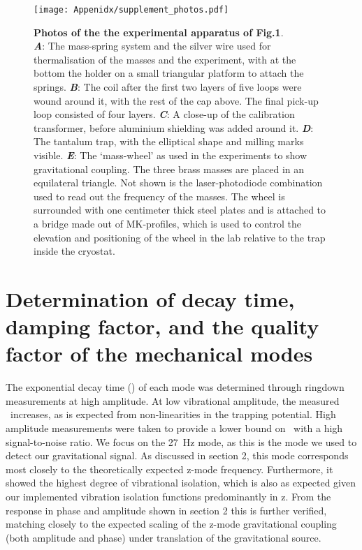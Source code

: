 \begin{appendices}
\begin{figure}[ht]
\centering
\texttt{[image: Appenidx/supplement\_photos.pdf]}%
\caption{\textbf{Photos of the the experimental apparatus of Fig.1}.\\ \textbf{\emph{A}}: The mass-spring system and the silver wire used for thermalisation of the masses and the experiment, with at the bottom the holder on a small triangular platform to attach the springs. \textbf{\emph{B}}: The coil after the first two layers of five loops were wound around it, with the rest of the cap above. The final pick-up loop consisted of four layers. \textbf{\emph{C}}: A close-up of the calibration transformer, before aluminium shielding was added around it. \textbf{\emph{D}}: The tantalum trap, with the elliptical shape and milling marks visible. \textbf{\emph{E}}: The `mass-wheel' as used in the experiments to show gravitational coupling. The three brass masses are placed in an equilateral triangle. Not shown is the laser-photodiode combination used to read out the frequency of the masses. The wheel is surrounded with one centimeter thick steel plates and is attached to a bridge made out of MK-profiles, which is used to control the elevation and positioning of the wheel in the lab relative to the trap inside the cryostat.}\label{fig_supp:photos}
\end{figure}

\clearpage

\section{Determination of decay time, damping factor, and the quality factor of the mechanical modes}
\label{app:qfactortransfer}
The exponential decay time (\texttau) of each mode was determined through ringdown measurements at high amplitude. At low vibrational amplitude, the measured \texttau\ increases, as is expected from non-linearities in the trapping potential. High amplitude measurements were taken to provide a lower bound on \texttau\ with a high signal-to-noise ratio. We focus on the \SI{27}{Hz} mode, as this is the mode we used to detect our gravitational signal. As discussed in section 2, this mode corresponds most closely to the theoretically expected z-mode frequency. Furthermore, it showed the highest degree of vibrational isolation, which is also as expected given our implemented vibration isolation functions predominantly in z. From the response in phase and amplitude shown in section 2 this is further verified, matching closely to the expected scaling of the z-mode gravitational coupling (both amplitude and phase) under translation of the gravitational source.


\end{appendices}
